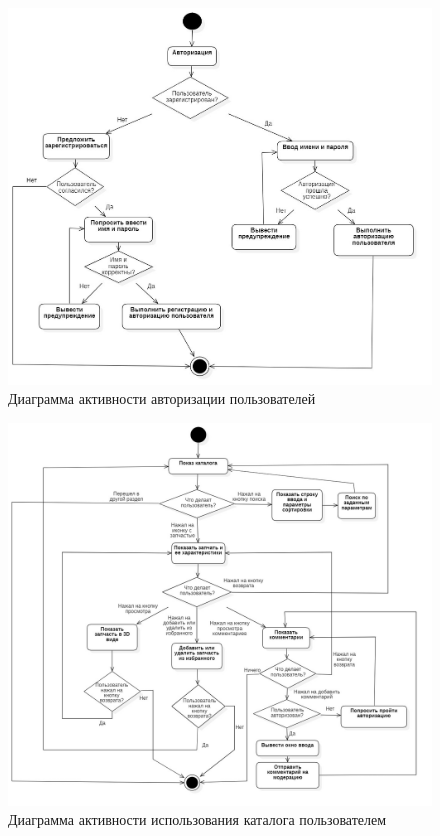 \documentclass[14pt]{extreport}
\begin{document}
\begin{figure}[H]
\centerline{\includegraphics[width=1\linewidth]{act_avto}}
\caption{Диаграмма активности авторизации пользователей}
\label{fig4}
\end{figure}

\begin{figure}[H]
\centerline{\includegraphics[width=1.05\linewidth]{act_pols}}
\caption{Диаграмма активности использования каталога пользователем}
\label{fig5}
\end{figure}
\end{document}
